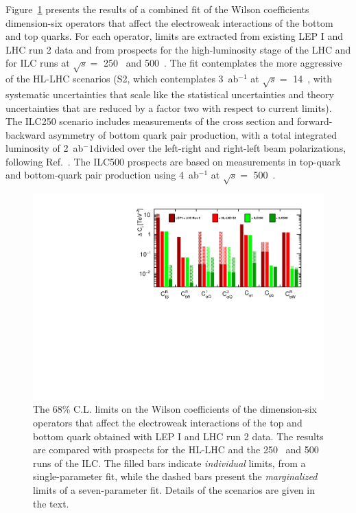 Figure~\ref{fig:top_bottom_ew_fit} presents the results of a combined fit of the Wilson coefficients
dimension-six operators that affect the electroweak interactions of the bottom and top quarks. 
For each operator, limits are extracted from existing LEP I and LHC run 2 data and from prospects
for the high-luminosity stage of the LHC and for ILC runs at $\sqrt{s}=$ 250~\GeV{} and 500~\GeV.
The fit contemplates the more aggressive of the HL-LHC scenarios (S2, which contemplates 3~ab$^{-1}${} 
at $\sqrt{s}=$ 14~\TeV, with systematic uncertainties that scale like the statistical 
uncertainties and theory uncertainties that are reduced by a factor two with respect to 
current limits). The ILC250 scenario includes measurements of the cross section and 
forward-backward asymmetry of bottom quark pair production, with a total integrated luminosity
of 2~ab$^-1$divided over the left-right and right-left beam polarizations, following Ref.~\cite{}.
The ILC500 prospects are based on measurements in top-quark and bottom-quark pair production
using 4~ab$^{-1}${} at $\sqrt{s}=$ 500~\GeV{}.

\begin{figure}[tb]
 \begin{center}
 \includegraphics[width=0.8\hsize]{chapters/figures/manhattan_plot_bottom_top.pdf}
\caption{The 68\% C.L. limits on the Wilson coefficients of the dimension-six operators that 
affect the electroweak interactions of the top and bottom quark obtained with LEP I and LHC 
run 2 data. The results are compared with prospects for the HL-LHC and the 250~\GeV{} and
500~\GeV{} runs of the ILC. The filled bars indicate {\em individual} limits, from a 
single-parameter fit, while the dashed bars present the {\em marginalized} limits of
a seven-parameter fit. Details of the scenarios are given in the text.
\label{fig:top_bottom_ew_fit}}
 \end{center}
 \vspace{-0.7cm}
 \end{figure}

